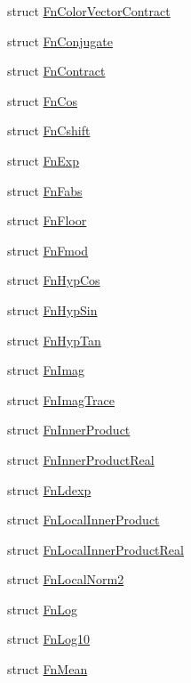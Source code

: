 \begin{DoxyCompactItemize}
\item 
struct \mbox{\hyperlink{structENSEM_1_1FnColorVectorContract}{Fn\+Color\+Vector\+Contract}}
\item 
struct \mbox{\hyperlink{structENSEM_1_1FnConjugate}{Fn\+Conjugate}}
\item 
struct \mbox{\hyperlink{structENSEM_1_1FnContract}{Fn\+Contract}}
\item 
struct \mbox{\hyperlink{structENSEM_1_1FnCos}{Fn\+Cos}}
\item 
struct \mbox{\hyperlink{structENSEM_1_1FnCshift}{Fn\+Cshift}}
\item 
struct \mbox{\hyperlink{structENSEM_1_1FnExp}{Fn\+Exp}}
\item 
struct \mbox{\hyperlink{structENSEM_1_1FnFabs}{Fn\+Fabs}}
\item 
struct \mbox{\hyperlink{structENSEM_1_1FnFloor}{Fn\+Floor}}
\item 
struct \mbox{\hyperlink{structENSEM_1_1FnFmod}{Fn\+Fmod}}
\item 
struct \mbox{\hyperlink{structENSEM_1_1FnHypCos}{Fn\+Hyp\+Cos}}
\item 
struct \mbox{\hyperlink{structENSEM_1_1FnHypSin}{Fn\+Hyp\+Sin}}
\item 
struct \mbox{\hyperlink{structENSEM_1_1FnHypTan}{Fn\+Hyp\+Tan}}
\item 
struct \mbox{\hyperlink{structENSEM_1_1FnImag}{Fn\+Imag}}
\item 
struct \mbox{\hyperlink{structENSEM_1_1FnImagTrace}{Fn\+Imag\+Trace}}
\item 
struct \mbox{\hyperlink{structENSEM_1_1FnInnerProduct}{Fn\+Inner\+Product}}
\item 
struct \mbox{\hyperlink{structENSEM_1_1FnInnerProductReal}{Fn\+Inner\+Product\+Real}}
\item 
struct \mbox{\hyperlink{structENSEM_1_1FnLdexp}{Fn\+Ldexp}}
\item 
struct \mbox{\hyperlink{structENSEM_1_1FnLocalInnerProduct}{Fn\+Local\+Inner\+Product}}
\item 
struct \mbox{\hyperlink{structENSEM_1_1FnLocalInnerProductReal}{Fn\+Local\+Inner\+Product\+Real}}
\item 
struct \mbox{\hyperlink{structENSEM_1_1FnLocalNorm2}{Fn\+Local\+Norm2}}
\item 
struct \mbox{\hyperlink{structENSEM_1_1FnLog}{Fn\+Log}}
\item 
struct \mbox{\hyperlink{structENSEM_1_1FnLog10}{Fn\+Log10}}
\item 
struct \mbox{\hyperlink{structENSEM_1_1FnMean}{Fn\+Mean}}

\end{DoxyCompactItemize}

